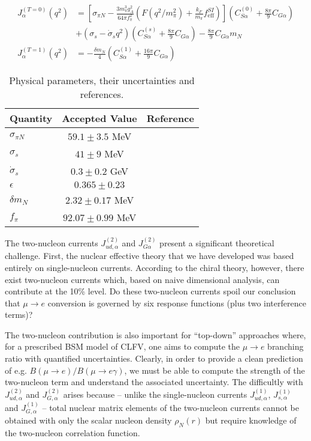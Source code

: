 \documentclass{book}[12pt]
\begin{document}
\begin{equation}
\begin{split}
J_{\alpha}^{(T=0)}(q^2)&=\left[\sigma_{\pi N}-\frac{3m_{\pi}^3g_A^2}{64\pi f_{\pi}^2}\left(F\left(q^2/m_{\pi}^2\right)+\frac{k_F}{m_{\pi}}f^{SI}_\mathrm{eff}\right)\right]\left(C^{(0)}_{S\alpha}+\frac{8\pi}{9}C_{G\alpha}\right)\\
&+\left(\sigma_s-\dot{\sigma}_sq^2\right)\left(C^{(s)}_{S\alpha}+\frac{8\pi}{9}C_{G\alpha}\right)-\frac{8\pi}{9}C_{G\alpha}m_N\\
J_{\alpha}^{(T=1)}(q^2)&=-\frac{\delta m_N}{4}\left(C_{S\alpha}^{(1)}+\frac{16\pi}{9}C_{G\alpha}\right)
\end{split}
\end{equation}
\begin{table}
\centering
\begin{tabular}{lcc}
\hline
\hline
Quantity & Accepted Value & Reference\\
\hline
$\sigma_{\pi N}$ & $59.1\pm 3.5$ MeV & \cite{hoferichter-2015} \\
$\sigma_s$ & $41\pm 9$ MeV & \cite{aoki2021flag} \\
$\dot{\sigma}_s$ & $0.3\pm 0.2$ GeV & \cite{hoferichter-2012}\\
$\epsilon$ & $0.365\pm 0.23$ & \cite{aoki2021flag} \\
$\delta m_N$ & $2.32\pm 0.17$ MeV & \cite{brantley2016strong} \\
$f_{\pi}$ & $92.07\pm 0.99$ MeV & \cite{aoki2021flag} \\
\hline
\hline
\end{tabular}
\caption{Physical parameters, their uncertainties and references.}
\label{tab:hadronic_params}
\end{table}
The two-nucleon currents $J^{(2)}_{ud,\alpha}$ and $J^{(2)}_{G\alpha}$ present a significant theoretical challenge. First, the nuclear effective theory that we have developed was based entirely on single-nucleon currents. According to the chiral theory, however, there exist two-nucleon currents which, based on naive dimensional analysis, can contribute at the 10\% level. Do these two-nucleon currents spoil our conclusion that $\mu\rightarrow e$ conversion is governed by six response functions (plus two interference terms)? 

The two-nucleon contribution is also important for ``top-down'' approaches where, for a prescribed BSM model of CLFV, one aims to compute the $\mu\rightarrow e$ branching ratio with quantified uncertainties. Clearly, in order to provide a clean prediction of e.g. $B(\mu\rightarrow e)/B(\mu\rightarrow e\gamma)$, we must be able to compute the strength of the two-nucleon term and understand the associated uncertainty. The difficultly with $J^{(2)}_{ud,\alpha}$ and $J_{G,\alpha}^{(2)}$ arises because -- unlike the single-nucleon currents $J^{(1)}_{ud,\alpha}$, $J^{(1)}_{s,\alpha}$ and $J^{(1)}_{G,\alpha}$ -- total nuclear matrix elements of the two-nucleon currents cannot be obtained with only the scalar nucleon density $\rho_N(r)$ but require knowledge of the two-nucleon correlation function. 
\end{document}
